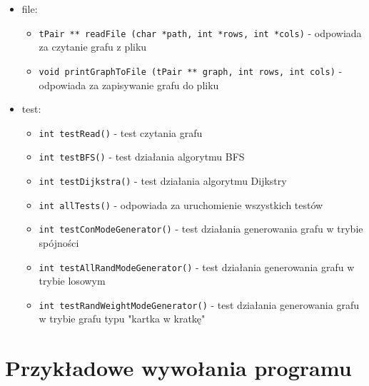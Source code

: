 \documentclass{article}
\begin{document}
\begin{itemize}
\item file:
    \begin{itemize}
    \item \texttt{\footnotesize tPair ** readFile (char *path, int *rows, int *cols)} - odpowiada za czytanie grafu z pliku
    \item \texttt{\footnotesize void printGraphToFile (tPair ** graph, int rows, int cols)} - odpowiada za zapisywanie grafu do pliku
    \end{itemize}

\item test:
    \begin{itemize}
    \item \texttt{\footnotesize int testRead()} - test czytania grafu
    \item \texttt{\footnotesize int testBFS()} - test działania algorytmu BFS
    \item \texttt{\footnotesize int testDijkstra()} - test działania algorytmu Dijkstry
    \item \texttt{\footnotesize int allTests()} - odpowiada za uruchomienie wszystkich testów
    \item \texttt{\footnotesize int testConModeGenerator()} - test działania generowania grafu w trybie spójności
   \item \texttt{\footnotesize int testAllRandModeGenerator()} - test działania generowania grafu w trybie losowym
    \item \texttt{\footnotesize int testRandWeightModeGenerator()} - test działania generowania grafu w trybie grafu typu "kartka w kratkę"
    
    \end{itemize}


\end{itemize}

\section{Przykładowe wywołania programu}
\end{document}
